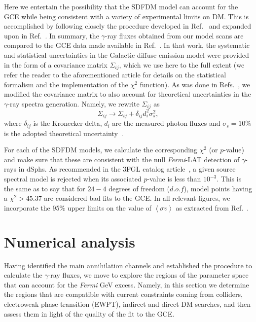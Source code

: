 Here we entertain the possibility that the SDFDM model can account for the GCE while being consistent with a variety of experimental limits on DM. This is accomplished by following closely the procedure developed in Ref.~\cite{CaloreCholisWeniger2015} and expanded upon in  Ref.~\cite{Caron:2015wda,Bertoneetal}. In summary, the $\gamma$-ray fluxes obtained from our model scans are compared to the GCE data made available in Ref.~\cite{CaloreCholisWeniger2015}. In that work, the systematic and statistical uncertainties in the Galactic diffuse emission model were provided in the form of a covariance matrix $\Sigma_{ij}$, which we use here to the full extent (we refer the reader to the aforementioned article for details on the statistical formalism and the implementation of the $\chi^2$ function). As was done in Refs.~\cite{Caron:2015wda,Bertoneetal}, we modified the covariance matrix to also account for theoretical uncertainties in the $\gamma$-ray spectra generation. Namely, we rewrite $\Sigma_{ij}$ as 
\begin{equation}
\Sigma_{ij} \rightarrow \Sigma_{ij} + \delta_{ij} d^2_{i} \sigma^2_s,
\end{equation}
where $\delta_{ij}$ is the Kronecker delta, $d_i$ are the measured photon fluxes and $\sigma_s=10$\% is the adopted theoretical uncertainty~\cite{Caron:2015wda,Bertoneetal}.


For each of the SDFDM models, we calculate the corresponding $\chi^2$ (or $p$-value) and make sure that these are consistent with the null \textit{Fermi}-LAT detection of $\gamma$-rays in dSphs. As recommended in the 3FGL catalog article~\cite{Acero:2015hja}, a given source spectral model is rejected when its associated $p$-value is less than $10^{-3}$. This is the same as to say that for $24-4$ degrees of freedom ($d.o.f$), model points having a $\chi^2>45.37$ are considered bad fits to the GCE. In all relevant figures, we incorporate the 95\% upper limits on the value of $\left\langle\sigma v \right\rangle$ as extracted from Ref.~\cite{Ackermann:2015zua}.


\section{Numerical analysis}
\label{sec:Parameter-scan}

Having identified the main annihilation channels and established the procedure to calculate the $\gamma$-ray fluxes, we move to explore the regions of the parameter space that can account for the {\it Fermi} GeV excess. Namely, in this section we determine the regions that are compatible with current constraints coming from colliders, electroweak phase transition (EWPT), indirect and direct DM searches, and then assess them in light of the quality of the fit to the GCE.     

